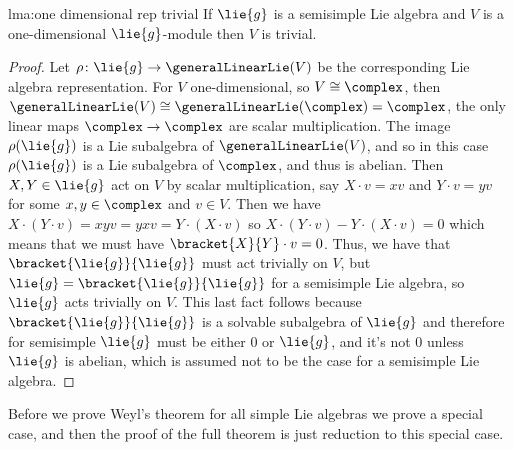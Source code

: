 \documentclass[fleqn]{NotesClass}
\newcommand{\isomorphic}{\cong}
\begin{document}
    \begin{lma}{}{lma:one dimensional rep trivial}
        If \(\lie{g}\) is a semisimple Lie algebra and \(V\) is a one-dimensional \(\lie{g}\)-module then \(V\) is trivial.
        \begin{proof}
            Let \(\rho \colon \lie{g} \to \generalLinearLie(V)\) be the corresponding Lie algebra representation.
            For \(V\) one-dimensional, so \(V \isomorphic \complex\), then \(\generalLinearLie(V) \isomorphic \generalLinearLie(\complex) = \complex\), the only linear maps \(\complex \to \complex\) are scalar multiplication.
            The image \(\rho(\lie{g})\) is a Lie subalgebra of \(\generalLinearLie(V)\), and so in this case \(\rho(\lie{g})\) is a Lie subalgebra of \(\complex\), and thus is abelian.
            Then \(X, Y \in \lie{g}\) act on \(V\) by scalar multiplication, say \(X \cdot v = xv\) and \(Y \cdot v = yv\) for some \(x, y \in \complex\) and \(v \in V\).
            Then we have \(X \cdot (Y \cdot v) = xyv = yxv = Y \cdot (X \cdot v)\) so \(X \cdot (Y \cdot v) - Y \cdot (X \cdot v) = 0\) which means that we must have \(\bracket{X}{Y} \cdot v = 0\).
            Thus, we have that \(\bracket{\lie{g}}{\lie{g}}\) must act trivially on \(V\), but \(\lie{g} = \bracket{\lie{g}}{\lie{g}}\) for a semisimple Lie algebra, so \(\lie{g}\) acts trivially on \(V\).
            This last fact follows because \(\bracket{\lie{g}}{\lie{g}}\) is a solvable subalgebra of \(\lie{g}\) and therefore for semisimple \(\lie{g}\) must be either 0 or \(\lie{g}\), and it's not 0 unless \(\lie{g}\) is abelian, which is assumed not to be the case for a semisimple Lie algebra.
        \end{proof}
    \end{lma}
    
    Before we prove Weyl's theorem for all simple Lie algebras we prove a special case, and then the proof of the full theorem is just reduction to this special case.
    
\end{document}
